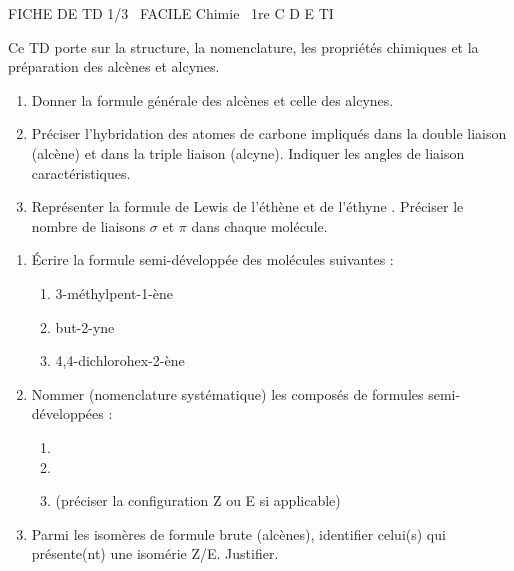 \documentclass[11pt]{article}
\begin{document}
\begin{tcolorbox}[enhanced,colback=popink,colframe=popink,arc=10pt,boxrule=0pt,left=12pt,right=12pt,top=9pt,bottom=9pt]
{\color{white}\popxbold\small FICHE DE TD 1/3 \textbullet\ FACILE \hfill Chimie \textbullet\ 1re C D E TI\par}
\end{tcolorbox}
\vspace{4pt}
Ce TD porte sur la structure, la nomenclature, les propriétés chimiques et la préparation des alcènes et alcynes.

\begin{exercice}
\begin{enumerate}
    \item Donner la formule générale des alcènes et celle des alcynes.
    \item Préciser l'hybridation des atomes de carbone impliqués dans la double liaison (alcène) et dans la triple liaison (alcyne). Indiquer les angles de liaison caractéristiques.
    \item Représenter la formule de Lewis de l'éthène  et de l'éthyne . Préciser le nombre de liaisons $\sigma$ et $\pi$ dans chaque molécule.
\end{enumerate}
\end{exercice}

\begin{exercice}
\begin{enumerate}
    \item Écrire la formule semi-développée des molécules suivantes :
    \begin{enumerate}
        \item 3-méthylpent-1-ène
        \item but-2-yne
        \item 4,4-dichlorohex-2-ène
    \end{enumerate}
    \item Nommer (nomenclature systématique) les composés de formules semi-développées :
    \begin{enumerate}
        \item {}
        \item {}
        \item {} (préciser la configuration Z ou E si applicable)
    \end{enumerate}
    \item Parmi les isomères de formule brute  (alcènes), identifier celui(s) qui présente(nt) une isomérie Z/E. Justifier.
\end{enumerate}
\end{exercice}
\end{document}
